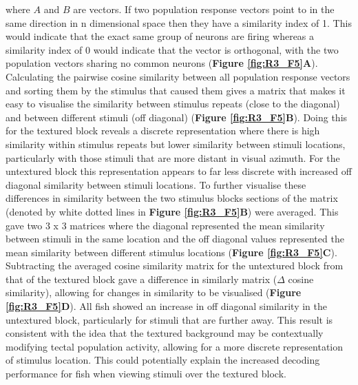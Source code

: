 where $A$ and $B$ are vectors. If two population response vectors point to in the same direction in n dimensional space then they have a similarity index of 1. This would indicate that the exact same group of neurons are firing whereas a similarity index of 0 would indicate that the vector is orthogonal, with the two population vectors sharing no common neurons (\textbf{Figure \ref{fig:R3_F5}A}). Calculating the pairwise cosine similarity between all population response vectors and sorting them by the stimulus that caused them gives a matrix that makes it easy to visualise the similarity between stimulus repeats (close to the diagonal) and between different stimuli (off diagonal) (\textbf{Figure \ref{fig:R3_F5}B}). Doing this for the textured block reveals a discrete representation where there is high similarity within stimulus repeats but lower similarity between stimuli locations, particularly with those stimuli that are more distant in visual azimuth. For the untextured block this representation appears to far less discrete with increased off diagonal similarity between stimuli locations. To further visualise these differences in similarity between the two stimulus blocks sections of the matrix (denoted by white dotted lines in \textbf{Figure \ref{fig:R3_F5}B}) were averaged. This gave two 3 x 3 matrices where the diagonal represented the mean similarity between stimuli in the same location and the off diagonal values represented the mean similarity between different stimulus locations (\textbf{Figure \ref{fig:R3_F5}C}). Subtracting the averaged cosine similarity matrix for the untextured block from that of the textured block gave a difference in similarly matrix ($\Delta$ cosine similarity), allowing for changes in similarity to be visualised (\textbf{Figure \ref{fig:R3_F5}D}). All fish showed an increase in off diagonal similarity in the untextured block, particularly for stimuli that are further away. This result is consistent with the idea that the textured background may be contextually modifying tectal population activity, allowing for a more discrete representation of stimulus location. This could potentially explain the increased decoding performance for fish when viewing stimuli over the textured block.

